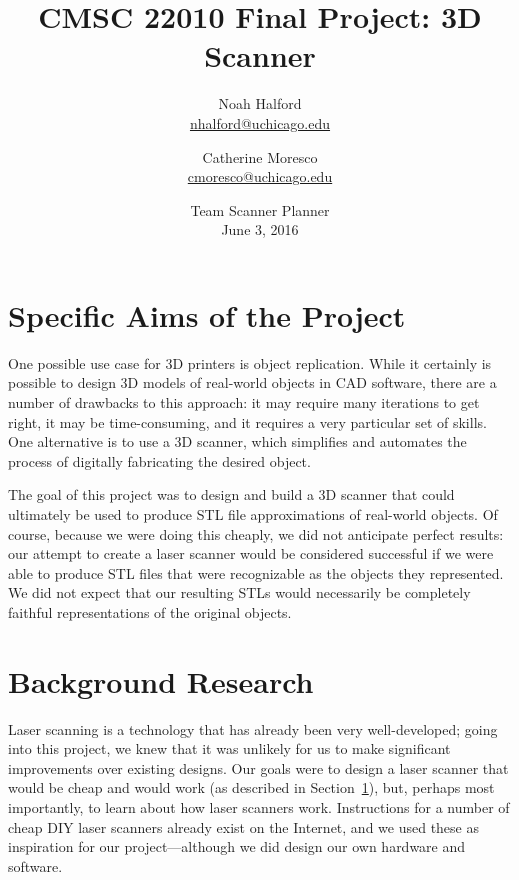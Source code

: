 \documentclass[12pt, letterpaper]{article}
\title{CMSC 22010 Final Project: 3D Scanner}
\author{Noah Halford\\
    \href{mailto:nhalford@uchicago.edu}{nhalford@uchicago.edu}
        \and
        Catherine Moresco\\
        \href{mailto:cmoresco@uchicago.edu}{cmoresco@uchicago.edu}}
\date{{\Large Team Scanner Planner}\\[5mm] June 3, 2016}
\begin{document}
\maketitle

\section{Specific Aims of the Project} \label{aims}

One possible use case for 3D printers is object replication. While it certainly is possible
to design 3D models of real-world objects in CAD software, there are a number of drawbacks
to this approach: it may require many iterations to get right, it may be time-consuming, and
it requires a very particular set of skills. One alternative is to use a 3D scanner, which
simplifies and automates the process of digitally fabricating the desired object.

The goal of this project was to design and build a 3D scanner that could ultimately be used
to produce STL file approximations of real-world objects. Of course, because we were doing
this cheaply, we did not anticipate perfect results: our attempt to create a laser scanner
would be considered successful if we were able to produce STL files that were recognizable
as the objects they represented. We did not expect that our resulting STLs would necessarily
be completely faithful representations of the original objects.


\section{Background Research}


Laser scanning is a technology that has already been very well-developed; going into
this project, we knew that it was unlikely for us to make significant improvements
over existing designs. Our goals were to design a laser scanner that would be cheap
and would work (as described in Section~\ref{aims}), but, perhaps most importantly,
to learn about how laser scanners work. Instructions for a number of cheap DIY laser
scanners already exist on the Internet, and we used these as inspiration for our
project---although we did design our own hardware and software.
\end{document}
